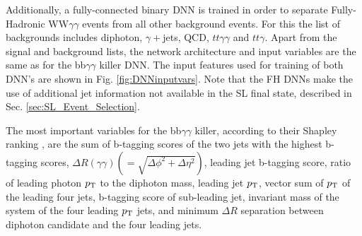 
Additionally, a fully-connected binary DNN is trained in order to separate Fully-Hadronic WW$\gamma\gamma$ events from all other background events.
For this the list of backgrounds includes diphoton, $\gamma+$jets, QCD, $tt\gamma\gamma$ and $tt\gamma$.
Apart from the signal and background lists, the network architecture and input variables are the same as for the bb$\gamma\gamma$ killer DNN. The input features 
used for training of both DNN's are shown in Fig. \ref{fig:DNNinputvars}. Note that the FH DNNs make the use of additional jet information not available in the SL final state, described in Sec. \ref{sec:SL_Event_Selection}. 

The most important variables for the bb$\gamma\gamma$ killer, according to their Shapley ranking \cite{shapley_values}, are
the sum of b-tagging scores of the two jets with the highest b-tagging scores, $\Delta R (\gamma\gamma) (=\sqrt{\Delta \phi^2 + \Delta \eta^2})$,
leading jet b-tagging score, ratio of leading photon $p_{\mathrm{T}}$ to the diphoton mass, leading jet $p_{\mathrm{T}}$,  vector sum of $p_{\mathrm{T}}$ of the leading four jets,
b-tagging score of sub-leading jet, invariant mass of the system of the four leading $p_{\mathrm{T}}$ jets, and minimum $\Delta R$ separation between
diphoton candidate and the four leading jets.

